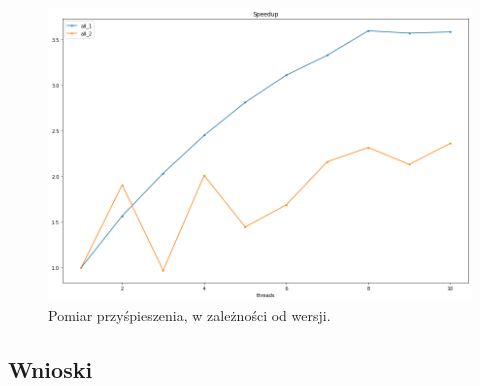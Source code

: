 \documentclass{article}
\begin{document}
        \begin{figure}[h!]
            \centering
            \includegraphics[width=17cm]{report2/images/Compare/speedup.png}
            \caption{Pomiar przyśpieszenia, w zależności od wersji. }
        \end{figure}

    \subsection{Wnioski}
    
    
\end{document}

